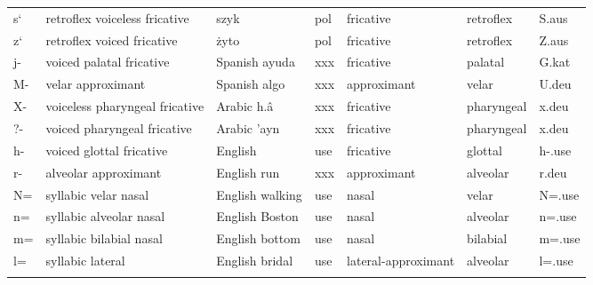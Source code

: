 \begin{longtable}{l|l|l|l|l|l|l}
s`	& retroflex voiceless fricative	& szyk	& pol	& fricative	& retroflex	& S.aus\\
z`	& retroflex voiced fricative	& żyto	& pol	& fricative	& retroflex	& Z.aus\\
j-	& voiced palatal fricative	& Spanish ayuda	& xxx	& fricative	& palatal	& G.kat\\
M-	& velar approximant	& Spanish algo	& xxx	& approximant	& velar	& U.deu\\
X-	& voiceless pharyngeal fricative	& Arabic h.â	& xxx	& fricative	& pharyngeal	& x.deu\\
?-	& voiced pharyngeal fricative	& Arabic 'ayn	& xxx	& fricative	& pharyngeal	& x.deu\\
h-	& voiced glottal fricative	& English	& use	& fricative	& glottal	& h-.use\\
r-	& alveolar approximant	& English run	& xxx	& approximant	& alveolar	& r.deu\\
N=	& syllabic velar nasal	& English walking	& use	& nasal	& velar	& N=.use\\
n=	& syllabic alveolar nasal	& English Boston	& use	& nasal	& alveolar	& n=.use\\
m=	& syllabic bilabial nasal	& English bottom	& use	& nasal	& bilabial	& m=.use\\
l=	& syllabic lateral	& English bridal	& use	& lateral-approximant	& alveolar	& l=.use\\
\end\{longtable\}

\newpage

\end{longtable}
